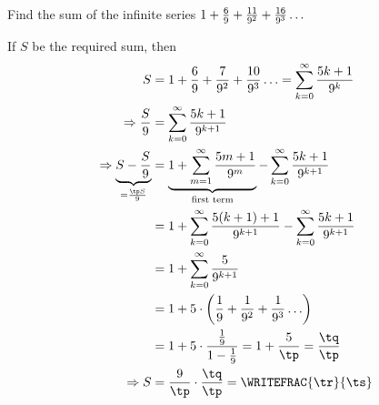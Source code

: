 




\gcalcexpr[0]
\gcalcexpr[0]
\gcalcexpr[0]\tr{\vbone * \tq}
\gcalcexpr[0]\ts{\tp * \tp }


\question[4] Find the sum of the infinite series $1 + \frac{6}{9} + \frac{11}{9^2} + 
\frac{16}{9^3}\ldots$

\watchout

\ifprintanswers
\fi 

\begin{solution}[\halfpage]
	If $S$ be the required sum, then
	\begin{align}
		S &= 1 + \frac{\vbthree}{\vbone} + \frac{7}{\vbone^2} + \frac{10}{\vbone^3}\ldots = 
      \sum_{k=0}^{\infty}\dfrac{\vbtwo k+1}{\vbone^k} \\
		\Rightarrow\dfrac{S}{\vbone} &= \sum_{k=0}^{\infty}\dfrac{\vbtwo k+1}{\vbone^{k+1}} \\
		\Rightarrow \underbrace{S - \dfrac{S}{\vbone}}_{= \frac{\tp S}{\vbone}} &= \underbrace{1 + \sum_{m=1}^{\infty}\dfrac{\vbtwo m+1}{\vbone^m}}
		_{\text{first term}}- \sum_{k=0}^{\infty}\dfrac{\vbtwo k+1}{\vbone^{k+1}} \\
		&= 1 + \sum_{k=0}^{\infty}\dfrac{\vbtwo (k+1)+1}{\vbone^{k+1}}-\sum_{k=0}^{\infty}\dfrac{\vbtwo k+1}{\vbone^{k+1}} \\
		&= 1 + \sum_{k=0}^{\infty}\dfrac{\vbtwo }{\vbone^{k+1}} \\
		&= 1 + \vbtwo\cdot\left( \dfrac{1}{\vbone} + \dfrac{1}{\vbone^2} + \dfrac{1}{\vbone^3}\ldots \right) \\
		&= 1 + \vbtwo\cdot\dfrac{\frac{1}{\vbone}}{1-\frac{1}{\vbone}} = 1 + \dfrac{\vbtwo}{\tp } = \dfrac{\tq}{\tp } \\
		\Rightarrow S &= \dfrac{\vbone}{\tp }\cdot\dfrac{\tq}{\tp } = \WRITEFRAC{\tr}{\ts}
	\end{align}
\end{solution}

